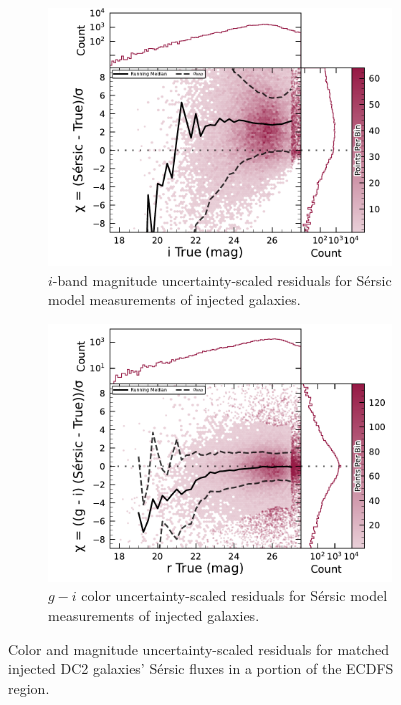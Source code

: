\begin{figure}[hbt!]
  \centering
  \begin{subfigure}[t]{0.45\textwidth}
  \includegraphics[width=\linewidth]{injected_lsst_cells_v1_5063_i_mag_chi_sersic}
  \caption{$i$-band magnitude uncertainty-scaled residuals for S\'ersic model measurements of injected galaxies.}
  \end{subfigure}\hfill
  \begin{subfigure}[t]{0.45\textwidth}
  \includegraphics[width=\linewidth]{injected_lsst_cells_v1_5063_r_color_chi_sersic_g_minus_i}
  \caption{$g-i$ color uncertainty-scaled residuals for S\'ersic model measurements of injected galaxies.}
  \end{subfigure}\hfill
\caption{Color and magnitude uncertainty-scaled residuals for matched injected DC2 galaxies' S\'ersic fluxes in a portion of the \gls{ECDFS} region.}
\label{fig:injected_lsst_cells_v1_5063_galaxy_sersic_chi}
\end{figure}

